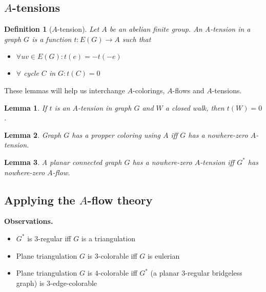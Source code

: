 \documentclass{article}
\newtheorem*{definition}{Definition}
\newtheorem*{lemma}{Lemma}
\begin{document}
\subsection*{$A$-tensions}

\begin{definition}[$A$-tension]
	Let $A$ be an abelian finite group. An \emph{A-tension} in a graph $G$
	is a function $t: E(G) \rightarrow A$ such that
	\begin{itemize}
		\item $\forall uv \in E(G): t(e) = -t(-e)$
		\item $\forall$ cycle $C$ in $G: t(C) = 0$
	\end{itemize}
\end{definition}

\noindent
These lemmas will help us interchange $A$-colorings, $A$-flows and
$A$-tensions.

\begin{lemma}
	If $t$ is an $A$-tension in graph $G$ and $W$ a closed walk, then
	$t(W) = 0$.
\end{lemma}

\begin{lemma}
	Graph $G$ has a propper coloring using $A$ iff $G$ has a nowhere-zero
	$A$-tension.
\end{lemma}

\begin{lemma}
	A planar connected graph $G$ has a nowhere-zero $A$-tension iff $G^*$
	has nowhere-zero $A$-flow.
\end{lemma}

%

\subsection*{Applying the $A$-flow theory}

\textbf{Observations.}
\begin{itemize}
	\item $G^*$ is $3$-regular iff $G$ is a triangulation
	\item Plane triangulation $G$ is $3$-colorable iff $G$ is eulerian
	\item Plane triangulation $G$ is $4$-colorable iff $G^*$ (a planar
		$3$-regular bridgeless graph) is $3$-edge-colorable
\end{itemize}
\end{document}
